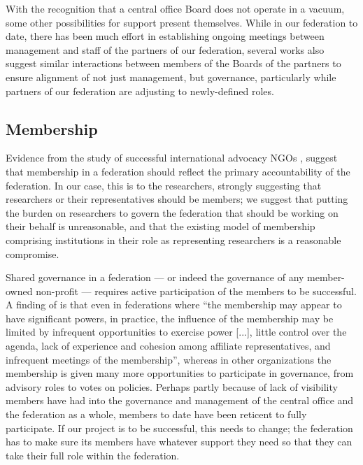 \documentclass[11pt, letterpaper, twoside]{article}
\begin{document}

With the recognition that a central office Board does not operate in a
vacuum, some other possibilities for support present themselves. While
in our federation to date, there has been much effort in establishing
ongoing meetings between management and staff of the partners of our
federation, several works also suggest similar interactions between
members of the Boards of the partners to ensure alignment of not just
management, but governance, particularly while partners of our
federation are adjusting to newly-defined roles.

\subsection*{Membership}
%

Evidence from the study of successful international advocacy NGOs \citep{Brown20121098},
suggest that membership in a federation should reflect the primary
accountability of the federation. In our case, this is to the
researchers, strongly suggesting that researchers or their
representatives should be members; we suggest that putting the burden on
researchers to govern the federation that should be working on their
behalf is unreasonable, and that the existing model of membership
comprising institutions in their role as representing researchers is a
reasonable compromise.


Shared governance in a federation --- or indeed the governance of any
member-owned non-profit --- requires active participation of the members
to be successful. A finding of \cite{widmer1999governance} is that even
in federations where ``the membership may appear to have significant
powers, in practice, the influence of the membership may be limited by
infrequent opportunities to exercise power {[}...{]}, little control over
the agenda, lack of experience and cohesion among affiliate
representatives, and infrequent meetings of the membership'', whereas in
other organizations the membership is given many more opportunities to
participate in governance, from advisory roles to votes on policies.
Perhaps partly because of lack of visibility members have had into the
governance and management of the central office and the federation as a
whole, members to date have been reticent to fully participate. If our
project is to be successful, this needs to change; the federation has to
make sure its members have whatever support they need so that they can
take their full role within the federation.
\end{document}
